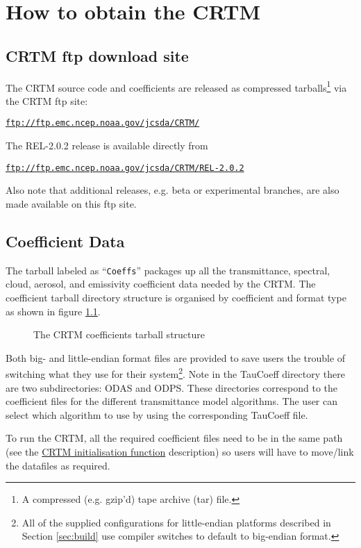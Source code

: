 \chapter{How to obtain the CRTM}

\section{CRTM ftp download site}
The CRTM source code and coefficients are released as compressed tarballs\footnote{A compressed (e.g. gzip'd) tape archive (tar) file.} via the CRTM ftp site:

\hspace{1cm}\href{ftp://ftp.emc.ncep.noaa.gov/jcsda/CRTM}{\texttt{ftp://ftp.emc.ncep.noaa.gov/jcsda/CRTM/}}

The REL-2.0.2 release is available directly from

\hspace{1cm}\href{ftp://ftp.emc.ncep.noaa.gov/jcsda/CRTM/REL-2.0.2}{\texttt{ftp://ftp.emc.ncep.noaa.gov/jcsda/CRTM/REL-2.0.2}}

Also note that additional releases, e.g. beta or experimental branches, are also made available on this ftp site.


\section{Coefficient Data}
The tarball labeled as ``\texttt{Coeffs}'' packages up all the transmittance, spectral, cloud, aerosol, and emissivity coefficient data needed by the CRTM. The coefficient tarball directory structure is organised by coefficient and format type as shown in figure \ref{fig:crtm_coefficients_dir}.

\begin{figure}[htb]
  \centering
  
  \caption{The CRTM coefficients tarball structure}
  \label{fig:crtm_coefficients_dir}
\end{figure}

Both big- and little-endian format files are provided to save users the trouble of switching what they use for their system\footnote{All of the supplied configurations for little-endian platforms described in Section \ref{sec:build} use compiler switches to default to big-endian format.}. Note in the TauCoeff directory there are two subdirectories: ODAS and ODPS. These directories correspond to the coefficient files for the different transmittance model algorithms. The user can select which algorithm to use by using the corresponding TauCoeff file.

To run the CRTM, all the required coefficient files need to be in the same path (see the  \hyperref[sec:CRTM_Init_interface]{CRTM initialisation function} description) so users will have to move/link the datafiles as required.
